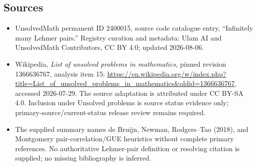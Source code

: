\documentclass[11pt]{article}
\begin{document}
\subsection{Sources}
\begin{itemize}
\item UnsolvedMath permanent ID 2400015, source code catalogue entry, ``Infinitely many Lehmer pairs.'' Registry curation and metadata: Ulam AI and UnsolvedMath Contributors, CC BY 4.0; updated 2026-08-06.
\item Wikipedia, \emph{List of unsolved problems in mathematics}, pinned revision 1366636767, analysis item 15: \url{https://en.wikipedia.org/w/index.php?title=List_of_unsolved_problems_in_mathematics&oldid=1366636767}, accessed 2026-07-29. The source adaptation is attributed under CC BY-SA 4.0. Inclusion under Unsolved problems is source status evidence only; primary-source/current-status release review remains required.
\item The supplied summary names de Bruijn, Newman, Rodgers--Tao (2018), and Montgomery pair-correlation/GUE heuristics without complete primary references. No authoritative Lehmer-pair definition or resolving citation is supplied; no missing bibliography is inferred.
\end{itemize}
\end{document}
